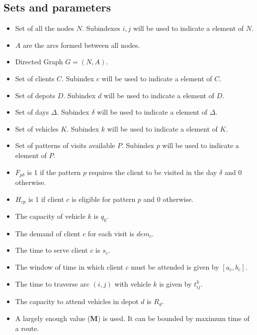 \documentclass[preprint,review,12pt]{elsarticle}
\begin{document}
\subsection{Sets and parameters}
\begin{itemize}
	\item Set of all the nodes $N$. Subindexes $i,j$ will be used to indicate a element of $N$.
	\item $A$ are the arcs formed between all nodes.
	\item Directed Graph $G = (N,A)$.
	\item Set of clients $C$. Subindex $c$ will be used to indicate a element of $C$.
	\item Set of depots $D$. Subindex $d$ will be used to indicate a element of $D$.
	\item Set of days  $\Delta$. Subindex $\delta$ will be used to indicate a element of $\Delta$.
	\item Set of vehicles $K$. Subindex $k$ will be used to indicate a element of $K$.
	\item Set of patterns of visits available $P$. Subindex $p$ will be used to indicate a element of $P$.
	\item $F_{p\delta}$ is 1 if the pattern $p$ requires the client to be visited in the day $\delta$ and 0 otherwise.
	\item $H_{cp}$ is 1 if client $c$ is eligible for pattern $p$ and 0 otherwise.
	\item The capacity of vehicle $k$ is $q_k$.
	\item The demand of client $c$ for each visit is $dem_c$.
	\item The time to serve client $c$ is $s_c$.
	\item The window of time in which client $c$ must be attended is given by $[a_c,b_c]$.
	\item The time to traverse arc $(i,j)$ with vehicle $k$ is given by $t_{ij}^k$.
	\item The capacity to attend vehicles in depot $d$ is $R_d$.
	\item A largely enough value (\textbf{M}) is used. It can be bounded by maximum time of a route.
	
	
\end{itemize}
 
\end{document}
